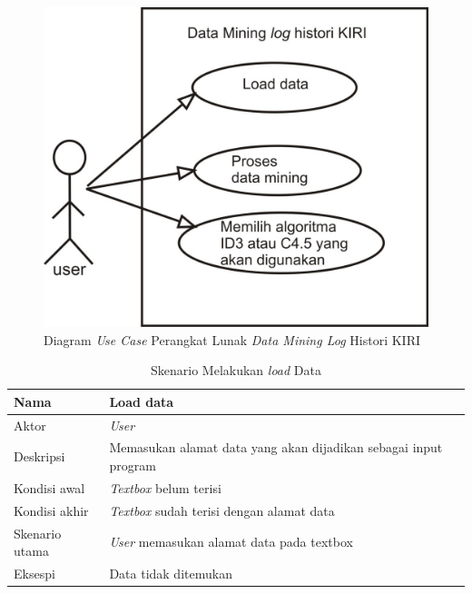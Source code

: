 \begin{figure}[H]
\centering
\includegraphics[scale=1]{Gambar/usecase.jpg}
\caption[Diagram \textsl{Use Case} Perangkat Lunak \textsl{Data Mining Log} Histori KIRI]{Diagram \textsl{Use Case} Perangkat Lunak \textsl{Data Mining Log} Histori KIRI} 
\label{fig:diagramUseCase}
\end{figure}

\begin{table}[H]
\caption{Skenario Melakukan \textsl{load} Data}
\begin{tabular}{|l|l|}
\hline
Nama           & Load data                                                       \\ \hline
Aktor          & \textit{User}                                                   \\ \hline
Deskripsi      & Memasukan alamat data yang akan dijadikan sebagai input program \\ \hline
Kondisi awal   & \textsl{Textbox} belum terisi                                   \\ \hline
Kondisi akhir  & \textsl{Textbox} sudah terisi dengan alamat data                \\ \hline
Skenario utama & \textit{User} memasukan alamat data pada textbox                \\ \hline
Eksespi        & Data tidak ditemukan                                            \\ \hline
\end{tabular}
\end{table}

